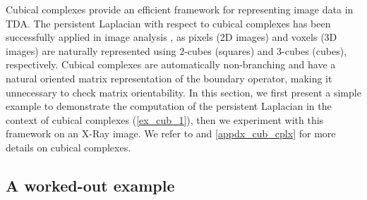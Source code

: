 \documentclass{article}
\theoremstyle{definition}
\begin{document}
Cubical complexes provide an efficient framework for representing image data in TDA. 
The persistent Laplacian with respect to cubical complexes has been successfully applied in image analysis \cite{davies23c}, 
as pixels (2D images) and voxels (3D images) are naturally represented using $2$-cubes (squares) and $3$-cubes (cubes), respectively. 
Cubical complexes are automatically non-branching and have a natural oriented matrix representation of the boundary operator, 
making it unnecessary to check matrix orientability.
In this section, we first present a simple example to demonstrate the computation of the persistent Laplacian in the context of cubical complexes (\cref{ex_cub_1}),
then we experiment with this framework on an X-Ray image.
We refer to \cite{MR3025945} and \cref{appdx_cub_cplx} for more details on cubical complexes.
\subsection{A worked-out example}


\end{document}
